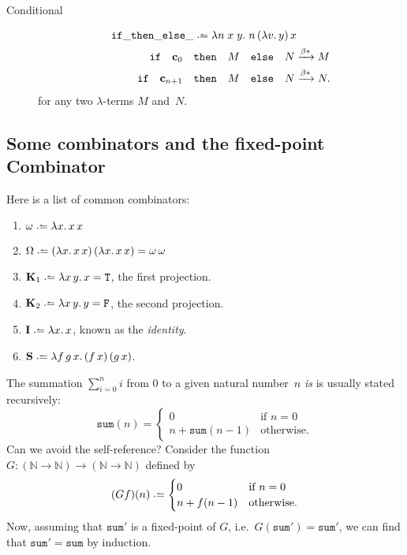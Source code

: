 \begin{description}
  \item[Conditional]
    \begin{align*}
      \mathtt{if}\_\mathtt{then}\_\mathtt{else}\_
      & \defeq \lambda n\;x\;y.\;n\,(\lambda v.\,y)\,x  \\
      \mathtt{if} \quad\bc_{0}\quad & \mathtt{then}\quad M\quad\mathtt{else}\quad
      N  \reduce M \\
      \mathtt{if} \quad\bc_{n+1}\quad &\mathtt{then}\quad M\quad\mathtt{else}\quad
      N \reduce N.
    \end{align*}
    for any two $\lambda$-terms $M$ and~$N$.
\end{description}

\subsection{Some combinators and the fixed-point Combinator}
Here is a list of common combinators:
\begin{enumerate}
  \item $\omega \defeq \lambda x.\, x\,x$
  \item $\Omega \defeq (\lambda x.\, x\,x)\,(\lambda x.\,x\,x)
    = \omega\,\omega$
  \item $\mathbf{K}_1 \defeq \lambda x\,y.\, x = \mathtt{T}$, the first projection.
  \item $\mathbf{K}_2 \defeq \lambda x\,y.\, y = \mathtt{F}$, the second projection.
  \item $\mathbf{I} \defeq \lambda x.\, x$, known as the \emph{identity}.
  \item $\mathbf{S}\defeq\lambda f\,g\,x.\, 
    (f\,x)\,(g\,x)$.
\end{enumerate}
\begin{example}
  The summation $\sum_{i = 0}^{n} i$ from $0$ to a given natural number~$n$
  \emph{is} is usually stated recursively:
  \[
    \mathtt{sum}(n) =
      \begin{cases} 
       0 & \text{if } n = 0 \\
       n + \mathtt{sum}(n - 1)  & \text{otherwise}.
      \end{cases}
  \]
  Can we avoid the self-reference? Consider the function
  $G\colon (\mathbb{N} \to \mathbb{N}) \to (\mathbb{N} \to \mathbb{N})$
  defined by
  \begin{equation} \label{eq:summation}
    (Gf)(n) \defeq
    \begin{cases}
       0 & \text{if } n = 0 \\
       n + f(n - 1)  & \text{otherwise}.
    \end{cases}
  \end{equation}
  Now, assuming that $\mathtt{sum}'$ is a fixed-point of $G$, i.e.\
  $G(\mathtt{sum}') =\mathtt{sum}'$, we can find that $\mathtt{sum}' =
  \mathtt{sum}$ by induction. 
\end{example}

